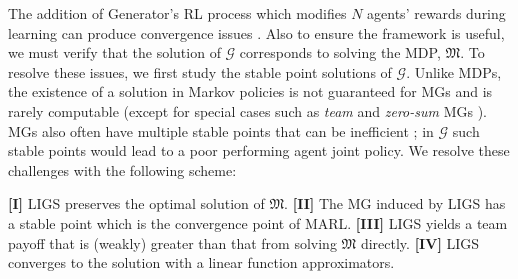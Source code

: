 \documentclass{article}
\begin{document}
The addition of {\selectfont Generator}'s RL process which modifies $N$ agents' rewards during learning can produce convergence issues \cite{zinkevich2006cyclic}.  Also to ensure the framework is useful, we must verify that the solution of $\mathcal{G}$ corresponds to solving the MDP, $\mathfrak{M}$. 
% 
% 
To resolve these issues, we first study the stable point solutions of $\mathcal{G}$.  Unlike MDPs, the existence of a solution in Markov policies is not guaranteed for MGs \cite{blackwell1968big} and is rarely computable (except for special cases such as \textit{team} and \textit{zero-sum} MGs \cite{shoham2008multiagent}).
MGs also often have multiple stable points that can be inefficient \cite{mguni2019coordinating}; in $\mathcal{G}$ such stable points would lead to a poor performing agent joint policy.
% 
We resolve these challenges with the following scheme: 

\noindent\textbf{[I]} LIGS preserves the optimal solution of $\mathfrak{M}$.\newline 
\noindent\textbf{[II]}  The MG induced by LIGS has a stable point which is the convergence point of MARL.\newline 
\noindent\textbf{[III]} LIGS yields a team payoff that is (weakly) greater than that from solving $\mathfrak{M}$ directly.\newline 
\noindent\textbf{[IV]}  LIGS  converges to the solution with a linear function approximators.

\end{document}
